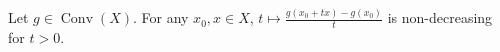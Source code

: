 Let $g\in\operatorname{Conv}(X)$. For any $x_0,x\in X$, $t\mapsto\frac{g(x_0+tx)-g(x_0)}{t}$ is non-decreasing for $t>0$.
